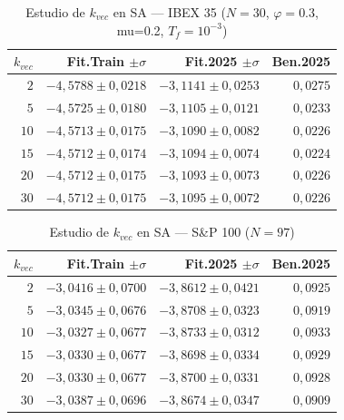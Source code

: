 \documentclass[12pt,a4paper]{article}
\begin{document}
\begin{table}[H]
\centering\footnotesize
\caption{Estudio de $k_{vec}$ en SA --- IBEX 35 ($N=30$, $\varphi=0.3$, mu=0.2, $T_f=10^{-3}$)}
\begin{tabular}{rrrr}
\toprule
$k_{vec}$ & \textbf{Fit.Train} $\pm\sigma$ & \textbf{Fit.2025} $\pm\sigma$ & \textbf{Ben.2025} \\
\midrule
$2$  & $-4{,}5788 \pm 0{,}0218$ & $-3{,}1141 \pm 0{,}0253$ & $0{,}0275$ \\
$5$  & $-4{,}5725 \pm 0{,}0180$ & $-3{,}1105 \pm 0{,}0121$ & $0{,}0233$ \\
$10$ & $-4{,}5713 \pm 0{,}0175$ & $-3{,}1090 \pm 0{,}0082$ & $0{,}0226$ \\
$15$ & $-4{,}5712 \pm 0{,}0174$ & $-3{,}1094 \pm 0{,}0074$ & $0{,}0224$ \\
$20$ & $-4{,}5712 \pm 0{,}0175$ & $-3{,}1093 \pm 0{,}0073$ & $0{,}0226$ \\
$30$ & $-4{,}5712 \pm 0{,}0175$ & $-3{,}1095 \pm 0{,}0072$ & $0{,}0226$ \\
\bottomrule
\end{tabular}
\end{table}

\begin{table}[H]
\centering\footnotesize
\caption{Estudio de $k_{vec}$ en SA --- S\&P 100 ($N=97$)}
\begin{tabular}{rrrr}
\toprule
$k_{vec}$ & \textbf{Fit.Train} $\pm\sigma$ & \textbf{Fit.2025} $\pm\sigma$ & \textbf{Ben.2025} \\
\midrule
$2$  & $-3{,}0416 \pm 0{,}0700$ & $-3{,}8612 \pm 0{,}0421$ & $0{,}0925$ \\
$5$  & $-3{,}0345 \pm 0{,}0676$ & $-3{,}8708 \pm 0{,}0323$ & $0{,}0919$ \\
$10$ & $-3{,}0327 \pm 0{,}0677$ & $-3{,}8733 \pm 0{,}0312$ & $0{,}0933$ \\
$15$ & $-3{,}0330 \pm 0{,}0677$ & $-3{,}8698 \pm 0{,}0334$ & $0{,}0929$ \\
$20$ & $-3{,}0330 \pm 0{,}0677$ & $-3{,}8700 \pm 0{,}0331$ & $0{,}0928$ \\
$30$ & $-3{,}0387 \pm 0{,}0696$ & $-3{,}8674 \pm 0{,}0347$ & $0{,}0909$ \\
\bottomrule
\end{tabular}
\end{table}
\end{document}
